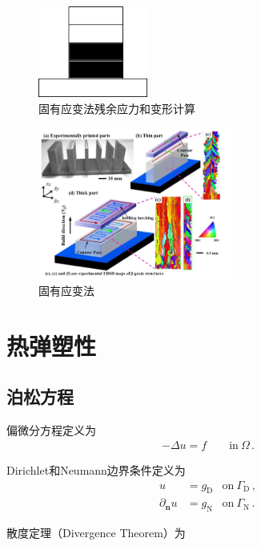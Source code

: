 \begin{figure}[!htbp]
  \centering
  \includegraphics[height=3cm]{fig/4/4.png}
  \caption{固有应变法残余应力和变形计算}
  \label{fig:4:4}
\end{figure}

\begin{figure}[!htbp]
  \centering
  \includegraphics[height=5cm]{fig/4/6.png}
  \caption{固有应变法}
  \label{fig:4:5}
\end{figure}

\section{热弹塑性}

\subsection{泊松方程}

偏微分方程定义为
\begin{align}\label{eq:4.1.1:1}
  -\Delta u = f \qquad \mathrm{in}\ \Omega\,.
\end{align}

Dirichlet和Neumann边界条件定义为
\begin{subequations}
  \begin{align}\label{eq:4.1.1:2}
    u &= g_{\mathrm D} &\mathrm{on}\ \Gamma_{\mathrm D}\,, \\
    \partial_{\mathbf n}u & = g_{\mathrm N} &\mathrm{on}\ \Gamma_{\mathrm N}\,.
  \end{align}
\end{subequations}

散度定理（Divergence Theorem）为

